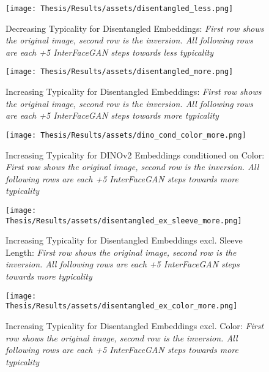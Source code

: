 \clearpage
\begin{figure}[!ht]
    \centering
    \texttt{[image: Thesis/Results/assets/disentangled\_less.png]}
    \caption[Decreasing Typicality for Disentangled Embeddings]{Decreasing Typicality for Disentangled Embeddings: \textit{First row shows the original image, second row is the inversion. All following rows are each +5 InterFaceGAN steps towards less typicality}}
    \label{fig:disentangled_less}
\end{figure}

\clearpage
\begin{figure}[!ht]
    \centering
    \texttt{[image: Thesis/Results/assets/disentangled\_more.png]}
    \caption[Increasing Typicality for Disentangled Embeddings]{Increasing Typicality for Disentangled Embeddings: \textit{First row shows the original image, second row is the inversion. All following rows are each +5 InterFaceGAN steps towards more typicality}}
    \label{fig:disentangled_more}
\end{figure}

\clearpage
\begin{figure}[!ht]
    \centering
    \texttt{[image: Thesis/Results/assets/dino\_cond\_color\_more.png]}
    \caption[Increasing Typicality for DINOv2 Embeddings conditioned on Color]{Increasing Typicality for DINOv2 Embeddings conditioned on Color: \textit{First row shows the original image, second row is the inversion. All following rows are each +5 InterFaceGAN steps towards more typicality}}
    \label{fig:dino_cond_color_more}
\end{figure}

\clearpage
\begin{figure}[!ht]
    \centering
    \texttt{[image: Thesis/Results/assets/disentangled\_ex\_sleeve\_more.png]}
    \caption[Increasing Typicality for Disentangled Embeddings excl. Sleeve Length]{Increasing Typicality for Disentangled Embeddings excl. Sleeve Length: \textit{First row shows the original image, second row is the inversion. All following rows are each +5 InterFaceGAN steps towards more typicality}}
    \label{fig:disentangled_ex_sleeve_more}
\end{figure}

\clearpage
\begin{figure}[!ht]
    \centering
    \texttt{[image: Thesis/Results/assets/disentangled\_ex\_color\_more.png]}
    \caption[Increasing Typicality for Disentangled Embeddings excl. Color]{Increasing Typicality for Disentangled Embeddings excl. Color: \textit{First row shows the original image, second row is the inversion. All following rows are each +5 InterFaceGAN steps towards more typicality}}
    \label{fig:disentangled_ex_color_more}
\end{figure}




